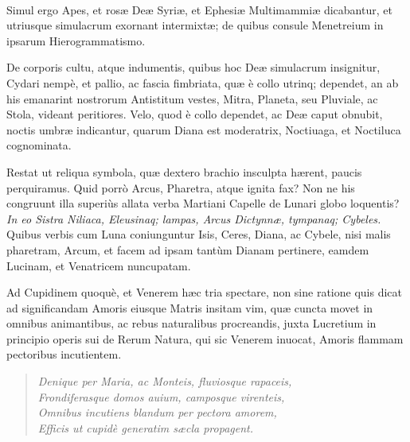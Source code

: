 \documentclass[a4paper, 11pt, oneside, polutonikogreek, latin]{article}
\begin{document}
\paragraph{}
Simul ergo Apes, et rosæ Deæ Syriæ, et Ephesiæ Multimammiæ dicabantur, et utriusque simulacrum exornant intermixtæ; de quibus consule Menetreium in ipsarum Hierogrammatismo.

De corporis cultu, atque indumentis, quibus hoc Deæ simulacrum insignitur, Cydari nempè, et pallio, ac fascia fimbriata, quæ è collo utrinq; dependet, an ab his emanarint nostrorum Antistitum vestes, Mitra, Planeta, seu Pluviale, ac Stola, videant peritiores. Velo, quod è collo dependet, ac Deæ caput obnubit, noctis umbræ indicantur, quarum Diana est moderatrix, Noctiuaga, et Noctiluca cognominata.

Restat ut reliqua symbola, quæ dextero brachio insculpta hærent, paucis perquiramus. Quid porrò Arcus, Pharetra, atque ignita fax? Non ne his congruunt illa superiùs allata verba Martiani Capelle de Lunari globo loquentis? \emph{In eo Sistra Niliaca, Eleusinaq; lampas, Arcus Dictynnæ, tympanaq; Cybeles.} Quibus verbis cum Luna coniunguntur Isis, Ceres, Diana, ac Cybele, nisi malis pharetram, Arcum, et facem ad ipsam tantùm Dianam pertinere, eamdem Lucinam, et Venatricem nuncupatam.

Ad Cupidinem quoquè, et Venerem hæc tria spectare, non sine ratione quis dicat ad significandam Amoris eiusque Matris insitam vim, quæ cuncta movet in omnibus animantibus, ac rebus naturalibus procreandis, juxta Lucretium in principio operis sui de Rerum Natura, qui sic Venerem inuocat, Amoris flammam pectoribus incutientem.
\begin{quote}
\emph{Denique per Maria, ac Monteis, fluviosque rapaceis,}\\
\emph{Frondiferasque domos auium, camposque virenteis,}\\
\emph{Omnibus incutiens blandum per pectora amorem,}\\
\emph{Efficis ut cupidè generatim sæcla propagent.}\\
\end{quote}
\end{document}

